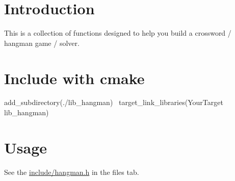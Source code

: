 \hypertarget{index_intro_sec}{}\section{Introduction}\label{index_intro_sec}
This is a collection of functions designed to help you build a crossword / hangman game / solver.\hypertarget{index_link}{}\section{Include with cmake}\label{index_link}
add\+\_\+subdirectory(./lib\+\_\+hangman)~\newline
target\+\_\+link\+\_\+libraries(\+Your\+Target    lib\+\_\+hangman)\hypertarget{index_usage}{}\section{Usage}\label{index_usage}
See the \hyperlink{hangman_8h}{include/hangman.\+h} in the files tab. 
